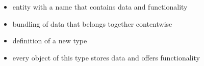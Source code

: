 \begin{itemize}
    \item entity with a name that contains data and functionality
    \item bundling of data that belongs together contentwise
    \item definition of a new type
    \item every object of this type stores data and offers functionality
\end{itemize}

